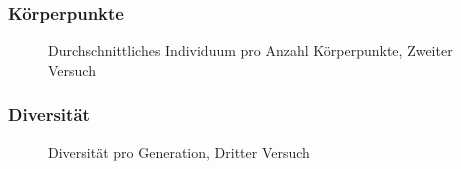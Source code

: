         \subsubsection{Körperpunkte}

          \begin{figure}
            
            \caption{Durchschnittliches Individuum pro Anzahl Körperpunkte, Zweiter Versuch\label{fig:graphBpThird}}
          \end{figure}

        \subsubsection{Diversität}
        \begin{figure}
          
          \caption{Diversität pro Generation, Dritter Versuch\label{fig:graphBpThird}}
        \end{figure}
